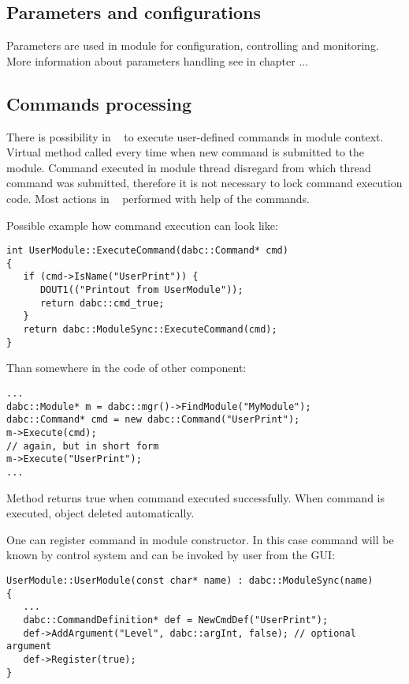 \subsection{Parameters and configurations}

Parameters are used in module for configuration, controlling and monitoring.
More information about parameters handling see in chapter ...


\subsection{Commands processing}

There is possibility in \dabc~ to execute user-defined commands in module context.
Virtual method  called every time when new command is submitted
to the module. Command  executed in module thread disregard from which thread
command was submitted, therefore it is not necessary to lock command execution code.
Most actions in \dabc~ performed with help of the commands. 

Possible example how command execution can look like:
\begin{small}
\begin{verbatim}
int UserModule::ExecuteCommand(dabc::Command* cmd) 
{
   if (cmd->IsName("UserPrint")) {
      DOUT1(("Printout from UserModule"));
      return dabc::cmd_true;
   }
   return dabc::ModuleSync::ExecuteCommand(cmd);
}
\end{verbatim}
\end{small}

Than somewhere in the code of other component:
\begin{small}
\begin{verbatim}
...
dabc::Module* m = dabc::mgr()->FindModule("MyModule"); 
dabc::Command* cmd = new dabc::Command("UserPrint");
m->Execute(cmd);
// again, but in short form
m->Execute("UserPrint");
...
\end{verbatim}
\end{small}
Method  returns true when command executed successfully. 
When command is executed,  object deleted automatically.  

One can register command in module constructor. In this case command will be 
known by control system and can be invoked by user from the GUI:

\begin{small}
\begin{verbatim}
UserModule::UserModule(const char* name) : dabc::ModuleSync(name) 
{
   ...
   dabc::CommandDefinition* def = NewCmdDef("UserPrint");
   def->AddArgument("Level", dabc::argInt, false); // optional argument
   def->Register(true);
}
\end{verbatim}
\end{small}


